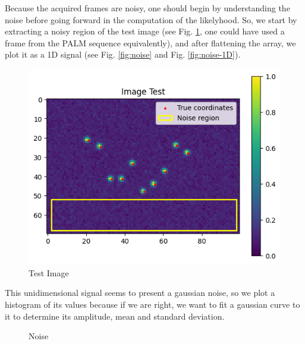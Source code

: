 \documentclass[10pt,letterpaper]{article}
\begin{document}
Because the acquired frames are noisy, one should begin by understanding the noise before going forward in the computation of the likelyhood. So, we start by extracting a noisy region of the test image (see Fig. \ref{fig:test}, one could have used a frame from the PALM sequence equivalently), and after flattening the array, we plot it as a 1D signal (see Fig. \ref{fig:noise} and Fig. \ref{fig:noise-1D}).

\begin{figure}[h]
	\centering
	\includegraphics[scale=0.55]{image-test.png}
	\caption{Test Image}
	\label{fig:test}
\end{figure}

This unidimensional signal seems to present a gaussian noise, so we plot a histogram of its values because if we are right, we want to fit a gaussian curve to it to determine its amplitude, mean and standard deviation.

\begin{figure}[h]
     \centering
     \caption{Noise}
\end{figure}
\end{document}
